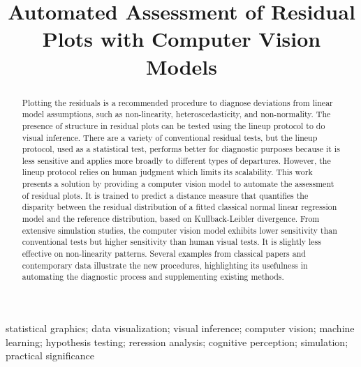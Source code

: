 \documentclass[]{interact}
\theoremstyle{plain}%
\theoremstyle{definition}
\theoremstyle{remark}
\begin{document}
\articletype{}

\title{Automated Assessment of Residual Plots with Computer Vision
Models}


\author{
}


\maketitle

\begin{abstract}
Plotting the residuals is a recommended procedure to diagnose deviations
from linear model assumptions, such as non-linearity,
heteroscedasticity, and non-normality. The presence of structure in
residual plots can be tested using the lineup protocol to do visual
inference. There are a variety of conventional residual tests, but the
lineup protocol, used as a statistical test, performs better for
diagnostic purposes because it is less sensitive and applies more
broadly to different types of departures. However, the lineup protocol
relies on human judgment which limits its scalability. This work
presents a solution by providing a computer vision model to automate the
assessment of residual plots. It is trained to predict a distance
measure that quantifies the disparity between the residual distribution
of a fitted classical normal linear regression model and the reference
distribution, based on Kullback-Leibler divergence. From extensive
simulation studies, the computer vision model exhibits lower sensitivity
than conventional tests but higher sensitivity than human visual tests.
It is slightly less effective on non-linearity patterns. Several
examples from classical papers and contemporary data illustrate the new
procedures, highlighting its usefulness in automating the diagnostic
process and supplementing existing methods.
\end{abstract}

\begin{keywords}
statistical graphics; data visualization; visual inference; computer
vision; machine learning; hypothesis testing; reression analysis;
cognitive perception; simulation; practical significance
\end{keywords}
\end{document}
